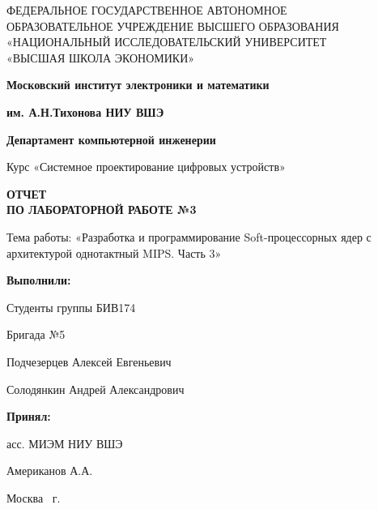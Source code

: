 \begin{titlepage}
	\begin{center}
 		ФЕДЕРАЛЬНОЕ  ГОСУДАРСТВЕННОЕ АВТОНОМНОЕ \\
		ОБРАЗОВАТЕЛЬНОЕ УЧРЕЖДЕНИЕ ВЫСШЕГО ОБРАЗОВАНИЯ\\
		«НАЦИОНАЛЬНЫЙ ИССЛЕДОВАТЕЛЬСКИЙ УНИВЕРСИТЕТ\\
		«ВЫСШАЯ ШКОЛА ЭКОНОМИКИ»
	\end{center}
	
	\begin{center}
		\textbf{Московский институт электроники и математики}
		
		\textbf{им. А.Н.Тихонова НИУ ВШЭ}
		
		\vspace{2ex}
		
		\textbf{Департамент компьютерной инженерии}
	\end{center}
	\vspace{1ex}	
	
	\begin{center}
		Курс «Системное проектирование цифровых устройств»
	\end{center}	
	
	
	\begin{center}
	\textbf{ОТЧЕТ\\
		ПО ЛАБОРАТОРНОЙ РАБОТЕ №3
	}
	\end{center}	

	\begin{center}
		Тема работы: «Разработка и программирование Soft-процессорных ядер с архитектурой однотактный MIPS. Часть 3»
	\end{center}

	\vspace{2ex}

	\begin{flushright}
		\textbf{Выполнили:}
		
		\vspace{2ex}
		
		Студенты группы БИВ174
		
		Бригада №5
		
		\vspace{2ex}
		
		Подчезерцев Алексей Евгеньевич
		
		Солодянкин Андрей Александрович
		\vspace{2ex}
		
		\textbf{Принял:}
		
		асс. МИЭМ НИУ ВШЭ
		
		Американов А.А.
		
	\end{flushright}

	\vfill
	\begin{center}
		Москва \the\year \, г.
	\end{center}
	
\end{titlepage}
\addtocounter{page}{1}